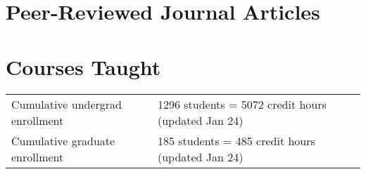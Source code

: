 \documentclass{article}
\begin{document}
\section*{Peer-Reviewed Journal Articles}




%


%




\section*{Courses Taught}

\begin{tabular}{p{}p{}}
Cumulative undergrad enrollment & 1296 students = 5072 credit hours (updated Jan 24)\\[4pt]
Cumulative graduate enrollment &  185 students = 485 credit hours (updated Jan 24)
\end{tabular}
\end{document}
